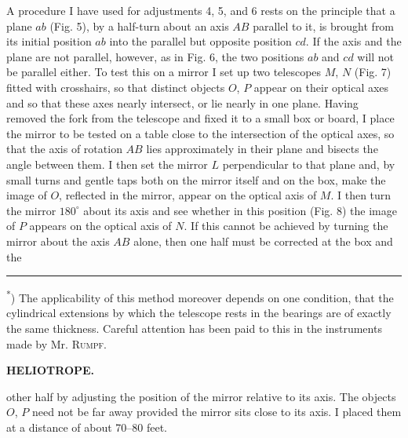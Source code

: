 \par\noindent\hspace*{\parindent}A procedure I have used for adjustments 4, 5, and 6 rests on the principle that a plane $ab$ (Fig. 5), by a half-turn about an axis $AB$ parallel to it, is brought from its initial position $ab$ into the parallel but opposite position $cd$. If the axis and the plane are not parallel, however, as in Fig. 6, the two positions $ab$ and $cd$ will not be parallel either. To test this on a mirror I set up two telescopes $M$, $N$ (Fig. 7) fitted with crosshairs, so that distinct objects $O$, $P$ appear on their optical axes and so that these axes nearly intersect, or lie nearly in one plane. Having removed the fork from the telescope and fixed it to a small box or board, I place the mirror to be tested on a table close to the intersection of the optical axes, so that the axis of rotation $AB$ lies approximately in their plane and bisects the angle between them. I then set the mirror $L$ perpendicular to that plane and, by small turns and gentle taps both on the mirror itself and on the box, make the image of $O$, reflected in the mirror, appear on the optical axis of $M$. I then turn the mirror $180^\circ$ about its axis and see whether in this position (Fig. 8) the image of $P$ appears on the optical axis of $N$. If this cannot be achieved by turning the mirror about the axis $AB$ alone, then one half must be corrected at the box and the
\par\medskip\noindent\rule{4cm}{.4pt}\par
\begingroup\footnotesize\noindent\hspace*{\parindent}\textsuperscript{*}) The applicability of this method moreover depends on one condition, that the cylindrical extensions by which the telescope rests in the bearings are of exactly the same thickness. Careful attention has been paid to this in the instruments made by Mr. \textsc{Rumpf}.\par\endgroup
\par\medskip\noindent{}\par

\par\clearpage
\noindent{}\hfill{\small\textbf{HELIOTROPE.}}\hfill\null\par\medskip
\noindent other half by adjusting the position of the mirror relative to its axis. The objects $O$, $P$ need not be far away provided the mirror sits close to its axis. I placed them at a distance of about 70--80 feet.

